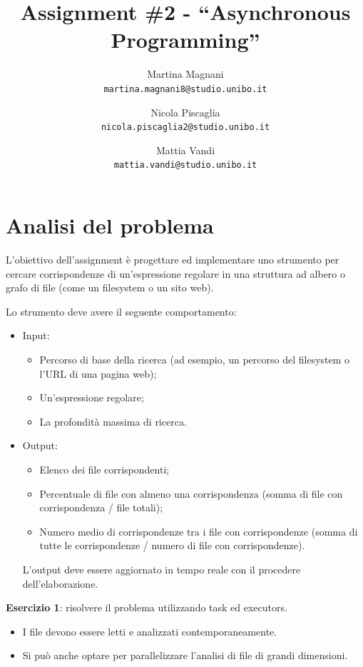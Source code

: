 \documentclass[a4paper]{article}
\title{\LARGE \bf
Assignment \#2 - ``Asynchronous Programming''
}
\author{
    Martina Magnani\\
    \texttt{martina.magnani8@studio.unibo.it}
    \and
    Nicola Piscaglia\\
    \texttt{nicola.piscaglia2@studio.unibo.it}
    \and
    Mattia Vandi\\
    \texttt{mattia.vandi@studio.unibo.it}
}
\date{}
\begin{document}
\maketitle

\section{Analisi del problema}\label{analisi-del-problema}

L'obiettivo dell'assignment è progettare ed implementare uno strumento per cercare corrispondenze di un'espressione regolare in una struttura ad albero o grafo di file (come un filesystem o un sito web).

Lo strumento deve avere il seguente comportamento:

\begin{itemize}
%
    \item Input\label{input}:
%
        \begin{itemize}
%
            \item Percorso di base della ricerca (ad esempio, un percorso del filesystem o l'URL di una pagina web);
%
            \item Un'espressione regolare;
%
            \item La profondit\`a massima di ricerca.
%
        \end{itemize}
%
    \item Output\label{output}:
%
        \begin{itemize}
%
            \item Elenco dei file corrispondenti;
%
            \item Percentuale di file con almeno una corrispondenza (somma di file con corrispondenza / file totali);
%
            \item Numero medio di corrispondenze tra i file con corrispondenze (somma di tutte le corrispondenze / numero di file con corrispondenze).
%
        \end{itemize}
%
        L'output deve essere aggiornato in tempo reale con il procedere dell'elaborazione.
%
\end{itemize}

\textbf{Esercizio 1}: risolvere il problema utilizzando task ed executors.

\begin{itemize}
%
    \item I file devono essere letti e analizzati contemporaneamente.
%
    \item Si pu\`o anche optare per parallelizzare l'analisi di file di grandi dimensioni.
%
\end{itemize}
\end{document}
